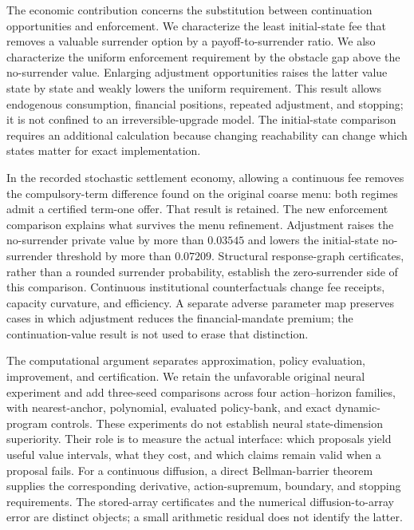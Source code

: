 The economic contribution concerns the substitution between continuation opportunities and enforcement. We characterize the least initial-state fee that removes a valuable surrender option by a payoff-to-surrender ratio. We also characterize the uniform enforcement requirement by the obstacle gap above the no-surrender value. Enlarging adjustment opportunities raises the latter value state by state and weakly lowers the uniform requirement. This result allows endogenous consumption, financial positions, repeated adjustment, and stopping; it is not confined to an irreversible-upgrade model. The initial-state comparison requires an additional calculation because changing reachability can change which states matter for exact implementation.

In the recorded stochastic settlement economy, allowing a continuous fee removes the compulsory-term difference found on the original coarse menu: both regimes admit a certified term-one offer. That result is retained. The new enforcement comparison explains what survives the menu refinement. Adjustment raises the no-surrender private value by more than $0.03545$ and lowers the initial-state no-surrender threshold by more than $0.07209$. Structural response-graph certificates, rather than a rounded surrender probability, establish the zero-surrender side of this comparison. Continuous institutional counterfactuals change fee receipts, capacity curvature, and efficiency. A separate adverse parameter map preserves cases in which adjustment reduces the financial-mandate premium; the continuation-value result is not used to erase that distinction.

The computational argument separates approximation, policy evaluation, improvement, and certification. We retain the unfavorable original neural experiment and add three-seed comparisons across four action--horizon families, with nearest-anchor, polynomial, evaluated policy-bank, and exact dynamic-program controls. These experiments do not establish neural state-dimension superiority. Their role is to measure the actual interface: which proposals yield useful value intervals, what they cost, and which claims remain valid when a proposal fails. For a continuous diffusion, a direct Bellman-barrier theorem supplies the corresponding derivative, action-supremum, boundary, and stopping requirements. The stored-array certificates and the numerical diffusion-to-array error are distinct objects; a small arithmetic residual does not identify the latter.

